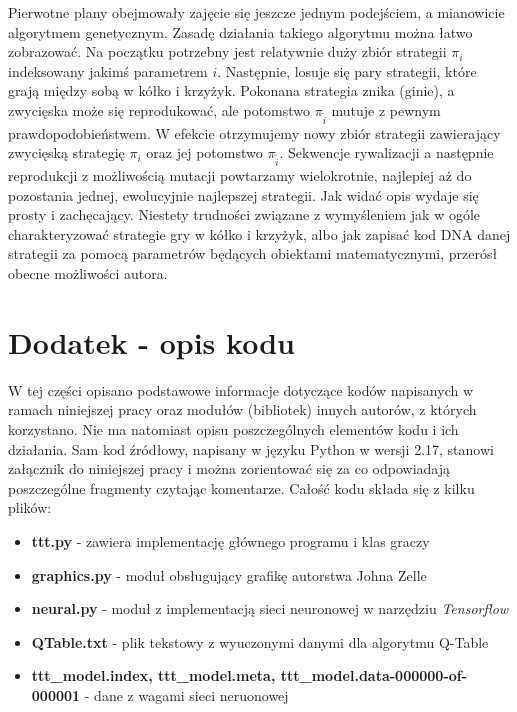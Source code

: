 \documentclass[licencjacka]{pracamgr}
\begin{document}
Pierwotne plany obejmowały zajęcie się jeszcze jednym podejściem, a mianowicie algorytmem genetycznym. Zasadę działania takiego algorytmu można łatwo zobrazować. Na początku potrzebny jest relatywnie duży zbiór strategii $\pi_{i}$ indeksowany jakimś parametrem $i$. Następnie, losuje się pary strategii, które grają między sobą w kółko i krzyżyk. Pokonana strategia znika (ginie), a zwycięska może się reprodukować, ale potomstwo $\pi_{\tilde{i}}$ mutuje z pewnym prawdopodobieństwem. W efekcie otrzymujemy nowy zbiór strategii zawierający zwycięską strategię $\pi_{i}$ oraz jej potomstwo $\pi_{\tilde{i}}$.  Sekwencje rywalizacji a następnie reprodukcji z możliwością mutacji powtarzamy wielokrotnie, najlepiej aż do pozostania jednej, ewolucyjnie najlepszej strategii. Jak widać opis wydaje się prosty i zachęcający. Niestety trudności związane z wymyśleniem jak w ogóle charakteryzować strategie gry w kółko i krzyżyk, albo jak zapisać kod DNA danej strategii za pomocą parametrów będących obiektami matematycznymi, przerósł obecne możliwości autora. 

\appendix

\chapter{Dodatek - opis kodu}
W tej części opisano podstawowe informacje dotyczące kodów napisanych w ramach niniejszej pracy oraz modułów (bibliotek) innych autorów, z których korzystano. Nie ma natomiast opisu poszczególnych elementów kodu i ich działania. Sam kod źródłowy, napisany w języku Python w wersji 2.17, stanowi załącznik do niniejszej pracy i można zorientować się za co odpowiadają poszczególne fragmenty czytając komentarze. Całość kodu składa się z kilku plików:
\begin{itemize}
	\item{\textbf{ttt.py} - zawiera implementację głównego programu i klas graczy}
	\item{\textbf{graphics.py} - moduł obsługujący grafikę autorstwa Johna Zelle \cite{Graphics}}
	\item{\textbf{neural.py} - moduł z implementacją sieci neuronowej w narzędziu \textit{Tensorflow}}
	\item{\textbf{QTable.txt} - plik tekstowy z wyuczonymi danymi dla algorytmu Q-Table}
	\item{ \textbf{ttt\_model.index, ttt\_model.meta, ttt\_model.data-000000-of-000001} - dane z wagami sieci neruonowej}
\end{itemize}
\end{document}
